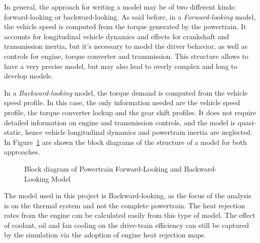 In general, the approach for writing a model may be of two different kinds: forward-looking or backward-looking. As said before, in a \emph{Forward-looking} model, the vehicle speed is computed from the torque generated by the powertrain. It accounts for  longitudinal vehicle dynamics and effects for crankshaft and transmission inertia, but it's necessary to model the driver behavior, as well as controls for engine, torque converter and transmission. This structure allows to have a very precise model, but may also lead to overly complex and long to develop models.

In a \emph{Backward-looking} model, the torque demand is computed from the vehicle speed profile. In this case, the only information needed are the vehicle speed profile, the torque converter lockup and the gear shift profiles. It does not require detailed information on engine and transmission controls, and the model is quasi-static, hence vehicle longitudinal dynamics and powertrain inertia are neglected. In Figure~\ref{fig:forward_backward_block_diagram} are shown the block diagrams of the structure of a model for both approaches.

\begin{figure}[ht]
  \caption{Block diagram of Powertrain Forward-Looking and Backward-Looking Model\label{fig:forward_backward_block_diagram} }
\end{figure}

The model used in this project is Backward-looking, as the focus of the analysis is on the thermal system and not the complete powertrain. The heat rejection rates from the engine can be calculated easily from this type of model. The effect of coolant, oil and fan cooling on the drive-train efficiency can still be captured by the simulation via the adoption of engine heat rejection maps.

